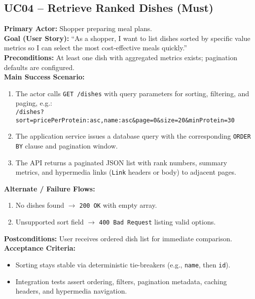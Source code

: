 \documentclass[11pt]{article}
\begin{document}
\subsection*{UC04 -- Retrieve Ranked Dishes (Must)}
\textbf{Primary Actor:} Shopper preparing meal plans.\\
\textbf{Goal (User Story):} ``As a shopper, I want to list dishes sorted by specific value metrics so I can select the most cost-effective meals quickly.''\\
\textbf{Preconditions:} At least one dish with aggregated metrics exists; pagination defaults are configured.\\
\textbf{Main Success Scenario:}
\begin{enumerate}[label=\arabic*.]
  \item The actor calls \texttt{GET /dishes} with query parameters for sorting, filtering, and paging, e.g.:\\
  \texttt{/dishes?sort=pricePerProtein:asc,name:asc\&page=0\&size=20\&minProtein=30}
  \item The application service issues a database query with the corresponding \texttt{ORDER BY} clause and pagination window.
  \item The API returns a paginated JSON list with rank numbers, summary metrics, and hypermedia links (\texttt{Link} headers or body) to adjacent pages.
\end{enumerate}
\textbf{Alternate / Failure Flows:}
\begin{enumerate}[label=\arabic*F.]
  \item No dishes found $\rightarrow$ \texttt{200 OK} with empty array.
  \item Unsupported sort field $\rightarrow$ \texttt{400 Bad Request} listing valid options.
\end{enumerate}
\textbf{Postconditions:} User receives ordered dish list for immediate comparison.\\
\textbf{Acceptance Criteria:}
\begin{itemize}[noitemsep]
  \item Sorting stays stable via deterministic tie-breakers (e.g., \texttt{name}, then \texttt{id}).
  \item Integration tests assert ordering, filters, pagination metadata, caching headers, and hypermedia navigation.
\end{itemize}
\end{document}
